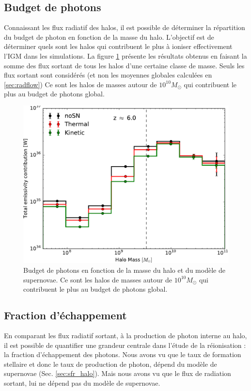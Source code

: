 \subsection{Budget de photons}

Connaissant les flux radiatif des halos, il est possible de déterminer la répartition du budget de photon en fonction de la masse du halo.
L'objectif est de déterminer quels sont les halos qui contribuent le plus à ioniser effectivement l'\ac{IGM} dans les simulations.
La figure \ref{fig:budget} présente les résultats obtenus en faisant la somme des flux sortant de tous les halos d'une certaine classe de masse.
Seuls les flux sortant sont considérés (et non les moyennes globales calculées en \ref{sec:radflow})
Ce sont les halos de masses autour de $10^{10} M_\odot$ qui contribuent le plus au budget de photons global.

\begin{figure}
	\centering
	\includegraphics[width=.95\linewidth]{img/03/totout.pdf} 
    \caption[Budget de photon]{Budget de photons en fonction de la masse du halo et du modèle de supernovae. Ce sont les halos de masses autour de $10^{10} M_\odot$ qui contribuent le plus au budget de photons global.
 	\label{fig:budget}}
\end{figure}


\subsection{Fraction d'échappement}


En comparant les flux radiatif sortant, à la production de photon interne au halo, il est possible de quantifier une grandeur centrale dans l'étude de la réionisation : la fraction d'échappement des photons.
Nous avons vu que le taux de formation stellaire et donc le taux de production de photon, dépend du modèle de supernovae (Sec. \ref{sec:sfr_halo}).
Mais nous avons vu que le flux de radiation sortant, lui ne dépend pas du modèle de supernovae.

